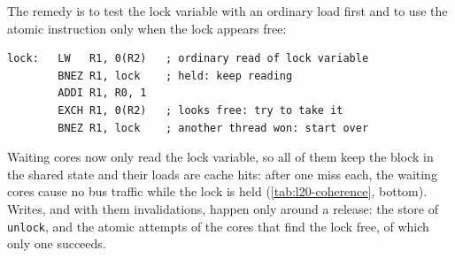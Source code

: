 \documentclass[../main.tex]{subfiles}
\begin{document}
The remedy is to test the lock variable with an ordinary load first and to
use the atomic instruction only when the lock appears free:
\begin{lstlisting}[language={[x86masm]Assembler}, numbers=none, deletekeywords={lock}]
lock:   LW   R1, 0(R2)   ; ordinary read of lock variable
        BNEZ R1, lock    ; held: keep reading
        ADDI R1, R0, 1
        EXCH R1, 0(R2)   ; looks free: try to take it
        BNEZ R1, lock    ; another thread won: start over
\end{lstlisting}
Waiting cores now only read the lock variable, so all of them keep the block
in the shared state and their loads are cache hits: after one miss each, the
waiting cores cause no bus traffic while the lock is held
(\cref{tab:l20-coherence}, bottom).  Writes, and with them invalidations,
happen only around a release: the store of \texttt{unlock}, and the atomic
attempts of the cores that find the lock free, of which only one succeeds.
\end{document}

